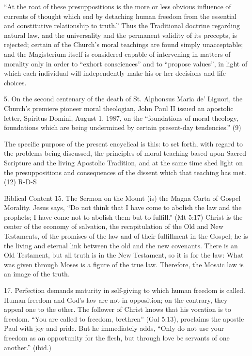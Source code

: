 \documentclass[oneside]{book}
\begin{document}
``At the root of these presuppositions is the more or less obvious influence of
currents of thought which end by detaching human freedom from the essential and
constitutive relationship to truth.'' Thus the Traditional doctrine regarding
natural law, and the universality and the permanent validity of its precepts, is
rejected; certain of the Church's moral teachings are found simply unacceptable;
and the Magisterium itself is considered capable of intervening in matters of
morality only in order to ``exhort consciences'' and to ``propose values'', in
light of which each individual will independently make his or her decisions and
life choices.

5. On the second centenary of the death of St. Alphonsus Maria de' Liguori, the
Church's premiere pioneer moral theologian, John Paul II issued an apostolic
letter, Spiritus Domini, August 1, 1987, on the ``foundations of moral theology,
foundations which are being undermined by certain present-day tendencies.'' (9)

The specific purpose of the present encyclical is this: to set forth, with
regard to the problems being discussed, the principles of moral teaching based
upon Sacred Scripture and the living Apostolic Tradition, and at the same time
shed light on the presuppositions and consequences of the dissent which that
teaching has met. (12)
R-D-S

Biblical Content
15. The Sermon on the Mount (is) the Magna Carta of Gospel Morality. Jesus says,
``Do not think that I have come to abolish the law and the prophets; I have come
not to abolish them but to fulfill.'' (Mt 5:17) Christ is the center of the
economy of salvation, the recapitulation of the Old and New Testaments, of the
promises of the law and of their fulfillment in the Gospel; he is the living and
eternal link between the old and the new covenants. There is an Old Testament,
but all truth is in the New Testament, so it is for the law: What was given
through Moses is a figure of the true law. Therefore, the Mosaic law is an image
of the truth.

17. Perfection demands maturity in self-giving to which human freedom is
called. Human freedom and God's law are not in opposition; on the contrary, they
appeal one to the other. The follower of Christ knows that his vocation is to
freedom. ``You are called to freedom, brethren'' (Gal 5:13), proclaims the
apostle Paul with joy and pride. But he immediately adds, ``Only do not use your
freedom as an opportunity for the flesh, but through love be servants of one
another.'' (ibid.)
\end{document}
